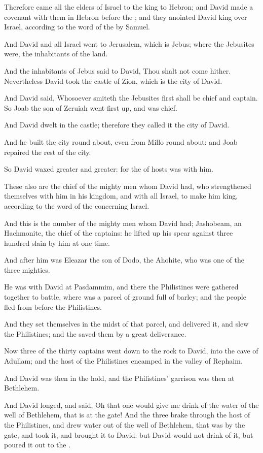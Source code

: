 \verse Therefore came all the elders of Israel to the king to Hebron; and David made a covenant with them in Hebron before the \LORD; and they anointed David king over Israel, according to the word of the \LORD by Samuel.

\verse And David and all Israel went to Jerusalem, which is Jebus; where the Jebusites were, the inhabitants of the land.

\verse And the inhabitants of Jebus said to David, Thou shalt not come hither. Nevertheless David took the castle of Zion, which is the city of David.

\verse And David said, Whosoever smiteth the Jebusites first shall be chief and captain. So Joab the son of Zeruiah went first up, and was chief.

\verse And David dwelt in the castle; therefore they called it the city of David.

\verse And he built the city round about, even from Millo round about: and Joab repaired the rest of the city.

\verse So David waxed greater and greater: for the \LORD of hosts was with him.

\verse These also are the chief of the mighty men whom David had, who strengthened themselves with him in his kingdom, and with all Israel, to make him king, according to the word of the \LORD concerning Israel.

\verse And this is the number of the mighty men whom David had; Jashobeam, an Hachmonite, the chief of the captains: he lifted up his spear against three hundred slain by him at one time.

\verse And after him was Eleazar the son of Dodo, the Ahohite, who was one of the three mighties.

\verse He was with David at Pasdammim, and there the Philistines were gathered together to battle, where was a parcel of ground full of barley; and the people fled from before the Philistines.

\verse And they set themselves in the midst of that parcel, and delivered it, and slew the Philistines; and the \LORD saved them by a great deliverance.

\verse Now three of the thirty captains went down to the rock to David, into the cave of Adullam; and the host of the Philistines encamped in the valley of Rephaim.

\verse And David was then in the hold, and the Philistines' garrison was then at Bethlehem.

\verse And David longed, and said, Oh that one would give me drink of the water of the well of Bethlehem, that is at the gate!  \verse And the three brake through the host of the Philistines, and drew water out of the well of Bethlehem, that was by the gate, and took it, and brought it to David: but David would not drink of it, but poured it out to the \LORD.

